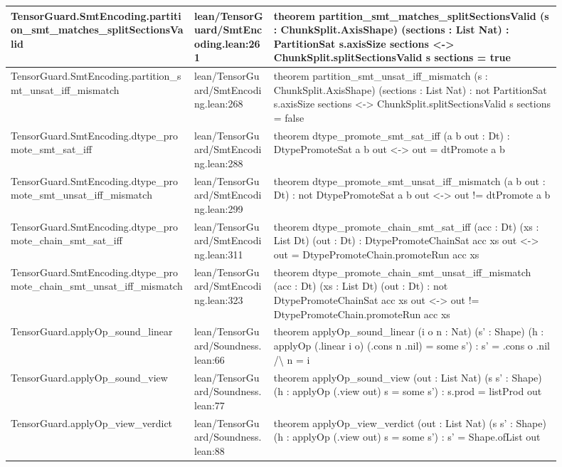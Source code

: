 \documentclass[10pt]{article}
\begin{document}
\begin{longtable}{|p{0.30\linewidth}|p{0.13\linewidth}|p{0.47\linewidth}|}
\hline
TensorGuard.SmtEncoding.partition\_smt\_matches\_splitSectionsValid & lean/TensorGuard/SmtEncoding.lean:261 & theorem partition\_smt\_matches\_splitSectionsValid (s : ChunkSplit.AxisShape) (sections : List Nat) : PartitionSat s.axisSize sections <-> ChunkSplit.splitSectionsValid s sections = true \\
\hline
TensorGuard.SmtEncoding.partition\_smt\_unsat\_iff\_mismatch & lean/TensorGuard/SmtEncoding.lean:268 & theorem partition\_smt\_unsat\_iff\_mismatch (s : ChunkSplit.AxisShape) (sections : List Nat) : not  PartitionSat s.axisSize sections <-> ChunkSplit.splitSectionsValid s sections = false \\
\hline
TensorGuard.SmtEncoding.dtype\_promote\_smt\_sat\_iff & lean/TensorGuard/SmtEncoding.lean:288 & theorem dtype\_promote\_smt\_sat\_iff (a b out : Dt) : DtypePromoteSat a b out <-> out = dtPromote a b \\
\hline
TensorGuard.SmtEncoding.dtype\_promote\_smt\_unsat\_iff\_mismatch & lean/TensorGuard/SmtEncoding.lean:299 & theorem dtype\_promote\_smt\_unsat\_iff\_mismatch (a b out : Dt) : not  DtypePromoteSat a b out <-> out != dtPromote a b \\
\hline
TensorGuard.SmtEncoding.dtype\_promote\_chain\_smt\_sat\_iff & lean/TensorGuard/SmtEncoding.lean:311 & theorem dtype\_promote\_chain\_smt\_sat\_iff (acc : Dt) (xs : List Dt) (out : Dt) : DtypePromoteChainSat acc xs out <-> out = DtypePromoteChain.promoteRun acc xs \\
\hline
TensorGuard.SmtEncoding.dtype\_promote\_chain\_smt\_unsat\_iff\_mismatch & lean/TensorGuard/SmtEncoding.lean:323 & theorem dtype\_promote\_chain\_smt\_unsat\_iff\_mismatch (acc : Dt) (xs : List Dt) (out : Dt) : not  DtypePromoteChainSat acc xs out <-> out != DtypePromoteChain.promoteRun acc xs \\
\hline
TensorGuard.applyOp\_sound\_linear & lean/TensorGuard/Soundness.lean:66 & theorem applyOp\_sound\_linear (i o n : Nat) (s' : Shape) (h : applyOp (.linear i o) (.cons n .nil) = some s') : s' = .cons o .nil /\textbackslash{} n = i \\
\hline
TensorGuard.applyOp\_sound\_view & lean/TensorGuard/Soundness.lean:77 & theorem applyOp\_sound\_view (out : List Nat) (s s' : Shape) (h : applyOp (.view out) s = some s') : s.prod = listProd out \\
\hline
TensorGuard.applyOp\_view\_verdict & lean/TensorGuard/Soundness.lean:88 & theorem applyOp\_view\_verdict (out : List Nat) (s s' : Shape) (h : applyOp (.view out) s = some s') : s' = Shape.ofList out \\

\end{longtable}
\end{document}
